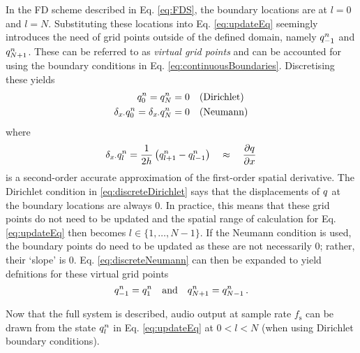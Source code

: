 In the FD scheme described in Eq. \eqref{eq:FDS}, the boundary locations are at $l = 0$ and $l = N$. Substituting these locations into Eq. \eqref{eq:updateEq} seemingly introduces the need of grid points outside of the defined domain, namely $q_{-1}^n$ and $q_{N+1}^n$. These can be referred to as \textit{virtual grid points} and can be accounted for using the boundary conditions in Eq. \eqref{eq:continuousBoundaries}. Discretising these yields
\begin{subequations}
    \begin{align}
        q_0^n = q_N^n &= 0 \quad\text{(Dirichlet)}\label{eq:discreteDirichlet}\\
        \delta_{x\cdot} q_0^n = \delta_{x\cdot} q_N^n &= 0 \quad \text{(Neumann)}\label{eq:discreteNeumann}
    \end{align}
\end{subequations}
where 
\begin{equation}
    \delta_{x\cdot}q_l^n = \frac{1}{2h}\left(q_{l+1}^n - q_{l-1}^n\right)\quad \approx\quad \frac{\partial q}{\partial x}
\end{equation}
is a second-order accurate approximation of the first-order spatial derivative. The Dirichlet condition in \eqref{eq:discreteDirichlet} says that the displacements of $q$ at the boundary locations are always 0. In practice, this means that these grid points do not need to be updated and the spatial range of calculation for Eq. \eqref{eq:updateEq} then becomes $l \in \{1, \hdots, N-1\}$. If the Neumann condition is used, the boundary points do need to be updated as these are not necessarily $0$; rather, their `slope' is $0$. Eq. \eqref{eq:discreteNeumann} can then be expanded to yield defnitions for these virtual grid points
\begin{equation}\label{eq:neumannSolution}
    q_{-1}^n = q_1^n \quad \text{and} \quad q_{N+1}^n = q_{N-1}^n\,.
\end{equation}

Now that the full system is described, audio output at sample rate $f_\text{s}$ can be drawn from the state $q_l^n$ in Eq. \eqref{eq:updateEq} at $0 < l < N$ (when using Dirichlet boundary conditions). %

